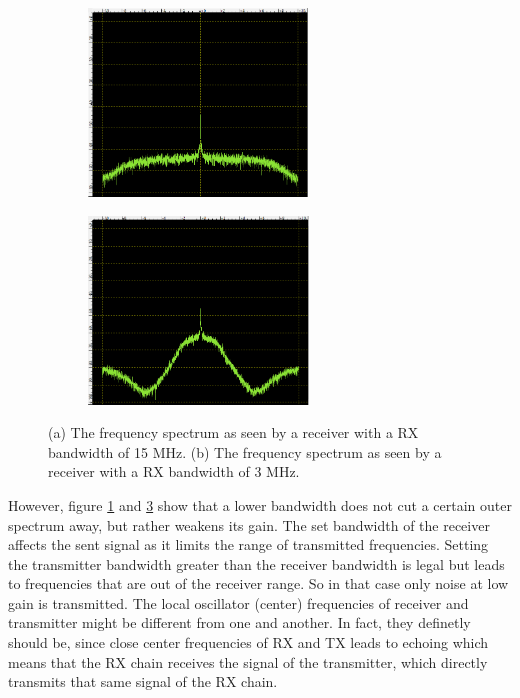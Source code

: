 \documentclass[journal]{IEEEtran}
\begin{document}
\begin{figure}
\centering
\begin{subfigure}[b]{0.45\textwidth}
   \includegraphics[width=1\linewidth, height=5cm]{fig/bandwidth_15MHz.PNG}
   \caption{}
   \label{fig:bw1} 
\end{subfigure}

\begin{subfigure}[b]{0.45\textwidth}
   \includegraphics[width=1\linewidth, height=5cm]{fig/bandwidth_3MHz.PNG}
   \caption{}
   \label{fig:bw2}
\end{subfigure}

\caption{ (a) The  frequency spectrum as seen by a receiver with a RX bandwidth of 15 MHz. 
 (b) The  frequency spectrum as seen by a receiver with a RX bandwidth of 3 MHz.  }
\end{figure}


However, figure \ref{fig:bw1} and \ref{fig:bw2} show that a lower bandwidth does not cut a certain outer spectrum away, but rather weakens its gain. 
The set bandwidth of the receiver affects the sent signal as it limits the range of transmitted frequencies. 
Setting the transmitter bandwidth greater than the receiver bandwidth is legal but leads to frequencies that are out of the receiver range.
So in that case only noise at low gain is transmitted.
The local oscillator (center) frequencies of receiver and transmitter might be different from one and another.
In fact, they definetly should be, since close center frequencies of RX and TX leads to echoing which means that the RX chain receives the signal of the transmitter, which directly transmits that same signal of the RX chain. 
\end{document}
